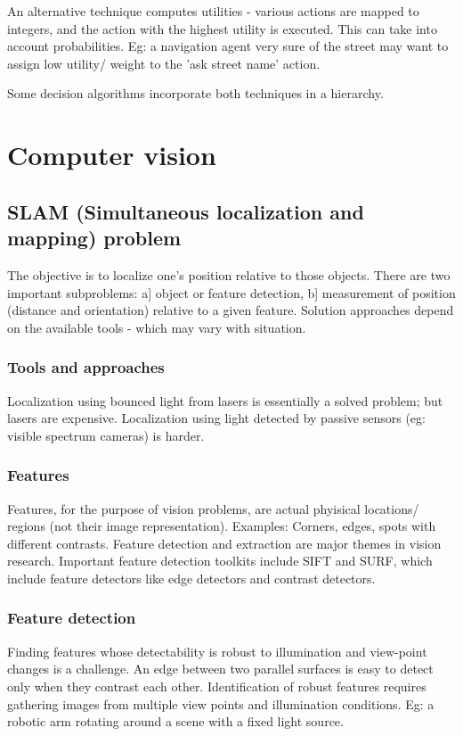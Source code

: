 \documentclass[oneside, article]{memoir}
\begin{document}
An alternative technique computes utilities - various actions are mapped to integers, and the action with the highest utility is executed. This can take into account probabilities. Eg: a navigation agent very sure of the street may want to assign low utility/ weight to the 'ask street name' action.

Some decision algorithms incorporate both techniques in a hierarchy.

\chapter{Computer vision}
\section{SLAM (Simultaneous localization and mapping) problem}
The objective is to localize one's position relative to those objects. There are two important subproblems: a] object or feature detection, b] measurement of position (distance and orientation) relative to a given feature.
Solution approaches depend on the available tools - which may vary with situation. 

\subsection{Tools and approaches}
Localization using bounced light from lasers is essentially a solved problem; but lasers are expensive. Localization using light detected by passive sensors (eg: visible spectrum cameras) is harder.

\subsection{Features}
Features, for the purpose of vision problems, are actual phyisical locations/ regions (not their image representation). Examples: Corners, edges, spots with different contrasts. Feature detection and extraction are major themes in vision research. Important feature detection toolkits include SIFT and SURF, which include feature detectors like edge detectors and contrast detectors.

\subsection{Feature detection}
Finding features whose detectability is robust to illumination and view-point changes is a challenge. An edge between two parallel surfaces is easy to detect only when they contrast each other. Identification of robust features requires gathering images from multiple view points and illumination conditions. Eg: a robotic arm rotating around a scene with a fixed light source.
\end{document}
